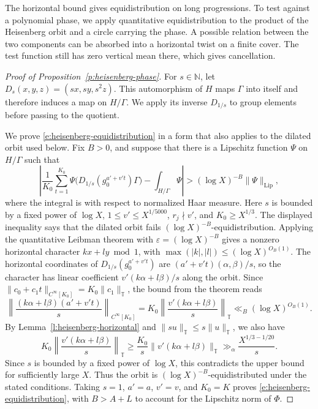 \documentclass[12pt]{amsart}
\newcommand{\1}{\mathbf 1}
\theoremstyle{definition}
\begin{document}
The horizontal bound gives equidistribution on long progressions.
To test against a polynomial phase, we apply quantitative
equidistribution to the product of the Heisenberg orbit and a circle
carrying the phase. A possible relation between the two components
can be absorbed into a horizontal twist on a finite cover. The test
function still has zero vertical mean there, which gives cancellation.

\begin{proof}[Proof of Proposition~\ref{p:heisenberg-phase}]
For \(s\in\mathbb N\), let \(D_s(x,y,z)=(sx,sy,s^2z)\).
This automorphism of \(H\) maps \(\Gamma\) into itself and
therefore induces a map on \(H/\Gamma\). We apply its inverse
\(D_{1/s}\) to group elements before passing to the quotient.

We prove \eqref{e:heisenberg-equidistribution} in a form that
also applies to the dilated orbit used below. Fix \(B>0\), and
suppose that there is a Lipschitz function \(\Psi\) on \(H/\Gamma\)
such that
\[
 \left|
 \frac1{K_0}\sum_{t=1}^{K_0}
 \Psi\bigl(D_{1/s}(g_0^{a'+v't})\Gamma\bigr)
 -\int_{H/\Gamma}\Psi
 \right|
 >(\log X)^{-B}\|\Psi\|_{\mathrm{Lip}},
\]
where the integral is with respect to normalized Haar measure.
Here \(s\) is bounded by a fixed power of \(\log X\),
\(1\leq v'\leq X^{1/5000}\), \(r_j\nmid v'\), and
\(K_0\geq X^{1/3}\). The displayed inequality says that the
dilated orbit fails \((\log X)^{-B}\)-equidistribution. Applying the quantitative Leibman theorem
\cite[Theorem~2.9]{GreenTaoNil} with
\(\varepsilon=(\log X)^{-B}\) gives a nonzero horizontal character
\(kx+ly\bmod 1\), with \(\max(|k|,|l|)\leq(\log X)^{O_B(1)}\).
The horizontal coordinates of \(D_{1/s}(g_0^{a'+v't})\) are
\((a'+v't)(\alpha,\beta)/s\), so the character has linear
coefficient \(v'(k\alpha+l\beta)/s\) along the orbit. Since
\(\|c_0+c_1t\|_{C^\infty[K_0]}=K_0\|c_1\|_{\mathbb T}\), the
bound from the theorem reads
\[
 \left\|\frac{(k\alpha+l\beta)(a'+v't)}{s}\right\|_{C^\infty[K_0]}
 =K_0\left\|\frac{v'(k\alpha+l\beta)}{s}\right\|_{\mathbb T}
 \ll_B(\log X)^{O_B(1)}.
\]
By Lemma~\ref{l:heisenberg-horizontal} and
\(\|su\|_{\mathbb T}\leq s\|u\|_{\mathbb T}\), we also have
\[
 K_0\left\|\frac{v'(k\alpha+l\beta)}{s}\right\|_{\mathbb T}
 \geq \frac{K_0}{s}\|v'(k\alpha+l\beta)\|_{\mathbb T}
 \gg_\alpha \frac{X^{1/3-1/20}}{s}.
\]
Since \(s\) is bounded by a fixed power of \(\log X\), this
contradicts the upper bound for sufficiently large \(X\). Thus
the orbit is \((\log X)^{-B}\)-equidistributed under the stated
conditions. Taking \(s=1\), \(a'=a\), \(v'=v\), and \(K_0=K\)
proves \eqref{e:heisenberg-equidistribution}, with \(B>A+L\) to
account for the Lipschitz norm of \(\Phi\).


\end{proof}
\end{document}
